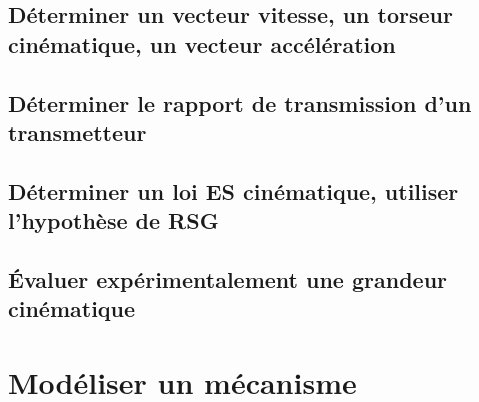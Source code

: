 \graphicspath{{\repStyle/png/}{../CIN/CIN-01-ModeliserSchemasCinematiques/15_SympactGalet/images/}} 
 
 
\graphicspath{{\repStyle/png/}{../CIN/CIN-01-ModeliserSchemasCinematiques/16_Poussoir/images/}} 
 
 
\graphicspath{{\repStyle/png/}{../CIN/CIN-01-ModeliserSchemasCinematiques/17_4Barres/images/}} 
 
 
\graphicspath{{\repStyle/png/}{../CIN/CIN-01-ModeliserSchemasCinematiques/18_Maxpid/images/}} 
 
 
\graphicspath{{\repStyle/png/}{../CIN/CIN-01-ModeliserSchemasCinematiques/46_RR_RSG/images/}} 
 
 
\graphicspath{{\repStyle/png/}{../CIN/CIN-01-ModeliserSchemasCinematiques/513_Divers_Tabouret/images/}} 
 
 
\graphicspath{{\repStyle/png/}{../CIN/CIN-01-ModeliserSchemasCinematiques/514_Divers_Tabouret/images/}} 
 
 
\section{Déterminer un vecteur vitesse, un torseur cinématique, un vecteur accélération} 
\section{Déterminer le rapport de transmission d'un transmetteur} 
\section{Déterminer un loi ES cinématique, utiliser l'hypothèse de RSG} 
\section{Évaluer expérimentalement une grandeur cinématique} 
\setchapterpreamble[u]{\margintoc} 
\chapter{Modéliser un mécanisme} 
